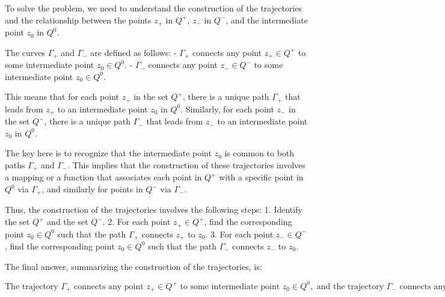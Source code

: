 To solve the problem, we need to understand the construction of the trajectories and the relationship between the points \( z_+ \) in \( Q^+ \), \( z_- \) in \( Q^- \), and the intermediate point \( z_0 \) in \( Q^0 \).

The curves \(\Gamma_+\) and \(\Gamma_-\) are defined as follows:
- \(\Gamma_+\) connects any point \( z_+ \in Q^+ \) to some intermediate point \( z_0 \in Q^0 \).
- \(\Gamma_-\) connects any point \( z_- \in Q^- \) to some intermediate point \( z_0 \in Q^0 \).

This means that for each point \( z_+ \) in the set \( Q^+ \), there is a unique path \(\Gamma_+\) that leads from \( z_+ \) to an intermediate point \( z_0 \) in \( Q^0 \). Similarly, for each point \( z_- \) in the set \( Q^- \), there is a unique path \(\Gamma_-\) that leads from \( z_- \) to an intermediate point \( z_0 \) in \( Q^0 \).

The key here is to recognize that the intermediate point \( z_0 \) is common to both paths \(\Gamma_+\) and \(\Gamma_-\). This implies that the construction of these trajectories involves a mapping or a function that associates each point in \( Q^+ \) with a specific point in \( Q^0 \) via \(\Gamma_+\), and similarly for points in \( Q^- \) via \(\Gamma_-\).

Thus, the construction of the trajectories involves the following steps:
1. Identify the set \( Q^+ \) and the set \( Q^- \).
2. For each point \( z_+ \in Q^+ \), find the corresponding point \( z_0 \in Q^0 \) such that the path \(\Gamma_+\) connects \( z_+ \) to \( z_0 \).
3. For each point \( z_- \in Q^- \), find the corresponding point \( z_0 \in Q^0 \) such that the path \(\Gamma_-\) connects \( z_- \) to \( z_0 \).

The final answer, summarizing the construction of the trajectories, is:

\[
\boxed{\text{The trajectory } \Gamma_+ \text{ connects any point } z_+ \in Q^+ \text{ to some intermediate point } z_0 \in Q^0, \text{ and the trajectory } \Gamma_- \text{ connects any point } z_- \in Q^- \text{ to some intermediate point } z_0 \in Q^0.}
\]